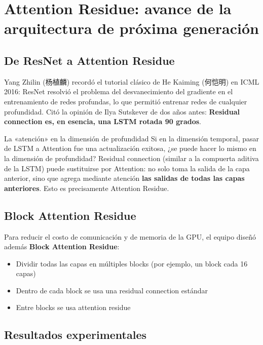 \documentclass[a4paper]{article}
\begin{document}
\section{Attention Residue: avance de la arquitectura de próxima generación}

\subsection{De ResNet a Attention Residue}

Yang Zhilin (杨植麟) recordó el tutorial clásico de He Kaiming (何恺明) en ICML 2016: ResNet resolvió el problema del desvanecimiento del gradiente en el entrenamiento de redes profundas, lo que permitió entrenar redes de cualquier profundidad. Citó la opinión de Ilya Sutskever de dos años antes: \textbf{Residual connection es, en esencia, una LSTM rotada 90 grados}.

\begin{knowledgebox}{La «atención» en la dimensión de profundidad}
Si en la dimensión temporal, pasar de LSTM a Attention fue una actualización exitosa, ¿se puede hacer lo mismo en la dimensión de profundidad? Residual connection (similar a la compuerta aditiva de la LSTM) puede sustituirse por Attention: no solo toma la salida de la capa anterior, sino que agrega mediante atención \textbf{las salidas de todas las capas anteriores}. Esto es precisamente Attention Residue.
\end{knowledgebox}

\subsection{Block Attention Residue}

Para reducir el costo de comunicación y de memoria de la GPU, el equipo diseñó además \textbf{Block Attention Residue}:
\begin{itemize}
    \item Dividir todas las capas en múltiples blocks (por ejemplo, un block cada 16 capas)
    \item Dentro de cada block se usa una residual connection estándar
    \item Entre blocks se usa attention residue
\end{itemize}

\subsection{Resultados experimentales}
\end{document}
